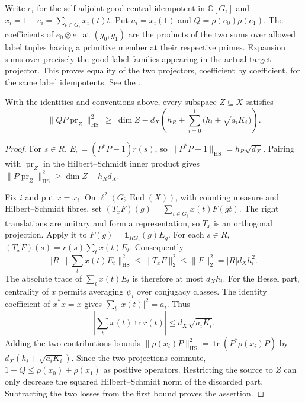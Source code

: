 Write $e_i$ for the self-adjoint good central idempotent in $\mathbb C[G_i]$ and
$x_i=1-e_i=\sum_{t\in G_i}x_i(t)t$. Put $a_i=x_i(1)$ and
$Q=\rho(e_0)\rho(e_1)$. The coefficients of $e_0\otimes e_1$ at
$(g_0,g_1)$ are the products of the two sums over allowed label tuples
having a primitive member at their respective primes. Expansion sums over
precisely the good label families appearing in the actual target projector.
This proves equality of the two projectors, coefficient by coefficient, for
the same label idempotents. See the
.

\begin{proposition}\label{prop:variable-projector-loss}
With the identities and conventions above, every subspace $Z\subseteq X$
satisfies
\[
 \|QP\operatorname{pr}_Z\|_{\mathrm{HS}}^2
 \ \ge\ \dim Z-d_X\left(h_R+
     \sum_{i=0}^1\bigl(h_i+\sqrt{a_i K_i}\bigr)\right).
\]
\end{proposition}
\begin{proof}
For $s\in R$, $E_s=(P^*P-1)r(s)$, so
$\|P^*P-1\|_{\mathrm{HS}}=h_R\sqrt{d_X}$. Pairing with
$\operatorname{pr}_Z$ in the Hilbert--Schmidt inner product gives
$\|P\operatorname{pr}_Z\|_{\mathrm{HS}}^2\ge\dim Z-h_R d_X$.

Fix $i$ and put $x=x_i$. On $\ell^2(G;\operatorname{End}(X))$, with
counting measure and Hilbert--Schmidt fibres, set
$(T_x F)(g)=\sum_{t\in G_i}x(t)F(gt)$. The right translations are unitary
and form a representation, so $T_x$ is an orthogonal projection.
Apply it to $F(g)=\mathbf1_{R G_i}(g)E_g$. For each $s\in R$,
$(T_xF)(s)=r(s)\sum_t x(t)E_t$. Consequently
\[
  |R|\Big\|\sum_t x(t)E_t\Big\|_{\mathrm{HS}}^2
     \le \|T_x F\|_2^2\le\|F\|_2^2=|R|d_Xh_i^2 .
\]
The absolute trace of $\sum_t x(t)E_t$ is
therefore at most $d_X h_i$. For the Bessel part, centrality of $x$ permits
averaging $\psi_i$ over conjugacy classes. The identity coefficient of
$x^*x=x$ gives $\sum_t|x(t)|^2=a_i$. Thus
\[
  \left|\sum_t x(t)\operatorname{tr}r(t)\right|
        \le d_X\sqrt{a_i K_i}.
\]
Adding the two contributions bounds
$\|\rho(x_i)P\|_{\mathrm{HS}}^2
 =\operatorname{tr}(P^*\rho(x_i)P)$ by $d_X(h_i+\sqrt{a_iK_i})$.
Since the two projections commute, $1-Q\le\rho(x_0)+\rho(x_1)$ as
positive operators. Restricting the source to $Z$ can only decrease the
squared Hilbert--Schmidt norm of the discarded part. Subtracting the two
losses from the first bound proves the assertion.
\end{proof}

